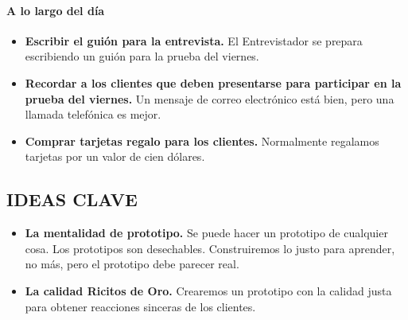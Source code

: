 \documentclass[10pt]{article}
\begin{document}
\begin{multicols}{2}
\paragraph{A lo largo del día}
\begin{itemize}
\item \textbf{Escribir el guión para la entrevista.} El Entrevistador se prepara escribiendo un guión para la prueba del viernes. 
\item \textbf{Recordar a los clientes que deben presentarse para participar en la prueba del viernes.} Un mensaje de correo electrónico está bien, pero una llamada telefónica es mejor.
\item \textbf{Comprar tarjetas regalo para los clientes.} Normalmente regalamos tarjetas por un valor de cien dólares.
\end{itemize}
\subsection*{IDEAS CLAVE}
\begin{itemize}
\item \textbf{La mentalidad de prototipo.} Se puede hacer un prototipo de cualquier cosa. Los prototipos son desechables. Construiremos lo justo para aprender, no más, pero el prototipo debe parecer real.
\item \textbf{La calidad Ricitos de Oro.} Crearemos un prototipo con la calidad justa para obtener reacciones sinceras de los clientes.
\end{itemize}
\end{multicols}
\end{document}
